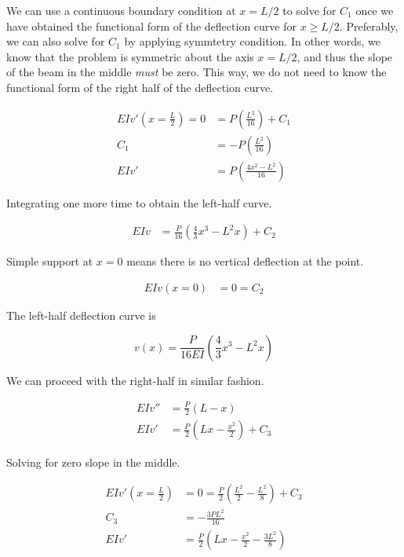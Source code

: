 \documentclass[a4paper,openany,12pt]{book}
\begin{document}
\begin{enumerate}
We can use a continuous boundary condition at \(x = L/2\) to solve for
\(C_1\) once we have obtained the functional form of the deflection curve
for \(x \geqslant L/2\). Preferably, we can also solve for \(C_1\) by
applying symmtetry condition. In other words, we know that the problem
is symmetric about the axis \(x = L/2\), and thus the slope of the beam in
the middle \emph{must} be zero. This way, we do not need to know the
functional form of the right half of the deflection curve.

$$\begin{aligned}
    EIv'(x= \frac{L}{2}) = 0 &= P \left( \frac{L^2}{16} \right) + C_1 \\
    C_1 &= -P \left( \frac{L^2}{16} \right) \\
    EIv' &= P \left( \frac{4x^2 - L^2}{16} \right)
  \end{aligned}$$

Integrating one more time to obtain the left-half curve.

$$\begin{aligned}
    EIv &= \frac{P}{16} \left( \frac{4}{3}x^3 - L^2x \right) + C_2
  \end{aligned}$$

Simple support at \(x = 0\) means there is no vertical deflection at the
point.

$$\begin{aligned}
    EIv(x=0) &= 0 = C_2
  \end{aligned}$$

The left-half deflection curve is

$$v(x) = \frac{P}{16EI} \left( \frac{4}{3}x^3 - L^2x \right)$$

We can proceed with the right-half in similar fashion.

$$\begin{aligned}
    EIv'' &= \frac{P}{2}(L - x) \\
    EIv' &= \frac{P}{2}(Lx - \frac{x^2}{2}) + C_3
  \end{aligned}$$

Solving for zero slope in the middle.

$$\begin{aligned}
    EIv'(x = \frac{L}{2}) &= 0 = \frac{P}{2} \left( \frac{L^2}{2} - \frac{L^2}{8} \right) + C_3 \\
    C_3 &= -\frac{3PL^2}{16} \\
    EIv' &= \frac{P}{2} \left( Lx - \frac{x^2}{2} - \frac{3L^2}{8} \right)
  \end{aligned}$$


\end{enumerate}
\end{document}
